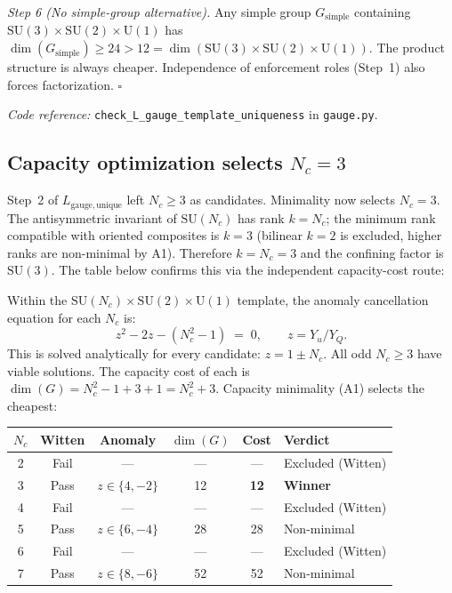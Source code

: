 \documentclass[11pt]{article}
\newcommand{\coderef}[2]{\smallskip\noindent\textit{Code reference:} \texttt{#1} in \texttt{#2}.}
\newcommand{\SU}{\mathrm{SU}}
\newcommand{\U}{\mathrm{U}}
\begin{document}
\begin{tcolorbox}[apfbox, title={Lemma $L_{\mathrm{gauge,unique}}$ (Gauge Template Uniqueness)}]
\medskip\noindent\textit{Step 6 (No simple-group alternative).}  Any simple group $G_{\mathrm{simple}}$ containing $\SU(3) \times \SU(2) \times \U(1)$ has $\dim(G_{\mathrm{simple}}) \ge 24 > 12 = \dim(\SU(3) \times \SU(2) \times \U(1))$.  The product structure is always cheaper.  Independence of enforcement roles (Step~1) also forces factorization.  $\square$

\coderef{check\_L\_gauge\_template\_uniqueness}{gauge.py}
\end{tcolorbox}

\subsection{Capacity optimization selects $N_c = 3$}

Step~2 of $L_{\mathrm{gauge,unique}}$ left $N_c \ge 3$ as candidates.  Minimality now selects $N_c = 3$.  The antisymmetric invariant of $\SU(N_c)$ has rank $k = N_c$; the minimum rank compatible with oriented composites is $k = 3$ (bilinear $k=2$ is excluded, higher ranks are non-minimal by A1).  Therefore $k = N_c = 3$ and the confining factor is $\SU(3)$.  The table below confirms this via the independent capacity-cost route:

Within the $\SU(N_c) \times \SU(2) \times \U(1)$ template, the anomaly cancellation equation for each $N_c$ is:
\begin{equation}
z^2 - 2z - (N_c^2 - 1) \;=\; 0, \qquad z = Y_u / Y_Q.
\label{eq:anomaly_cancel}
\end{equation}
This is solved analytically for every candidate: $z = 1 \pm N_c$.  All odd $N_c \ge 3$ have viable solutions.  The capacity cost of each is $\dim(G) = N_c^2 - 1 + 3 + 1 = N_c^2 + 3$.  Capacity minimality (A1) selects the cheapest:

\begin{center}
\small
\begin{tabular}{cccccl}
\toprule
$N_c$ & Witten & Anomaly & $\dim(G)$ & Cost & Verdict \\
\midrule
2 & Fail & --- & --- & --- & Excluded (Witten) \\
3 & Pass & $z \in \{4, -2\}$ & 12 & \textbf{12} & \textbf{Winner} \\
4 & Fail & --- & --- & --- & Excluded (Witten) \\
5 & Pass & $z \in \{6, -4\}$ & 28 & 28 & Non-minimal \\
6 & Fail & --- & --- & --- & Excluded (Witten) \\
7 & Pass & $z \in \{8, -6\}$ & 52 & 52 & Non-minimal \\
\bottomrule
\end{tabular}
\end{center}
\end{document}
